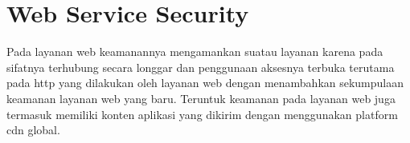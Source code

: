 \section{Web Service Security}
Pada layanan web keamanannya mengamankan suatau layanan karena pada sifatnya terhubung secara longgar dan penggunaan aksesnya terbuka terutama pada http yang
 dilakukan oleh layanan web dengan menambahkan sekumpulaan keamanan layanan web yang baru. Teruntuk keamanan pada layanan web juga termasuk memiliki konten aplikasi yang dikirim dengan menggunakan platform cdn global. 




    

